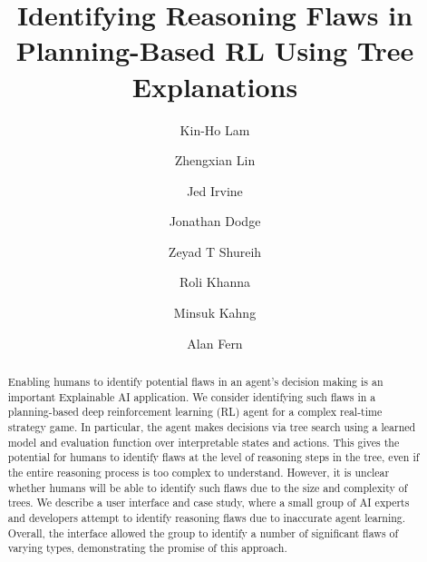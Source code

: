 \documentclass{article}
\title{Identifying Reasoning Flaws in Planning-Based RL Using Tree Explanations}
\author{
Kin-Ho Lam\and%
Zhengxian Lin\and%
Jed Irvine\and%
Jonathan Dodge\and
Zeyad T Shureih\and%
Roli Khanna\and
Minsuk Kahng\and
Alan Fern\and 
\affiliations
}
\begin{document}
\maketitle

\begin{abstract}
Enabling humans to identify potential flaws in an agent's decision making is an important Explainable AI application. We consider identifying such flaws in a planning-based deep reinforcement learning (RL) agent for a complex real-time strategy game. In particular, the agent makes decisions via tree search using a learned model and evaluation function over interpretable states and actions. This gives the potential for humans to identify flaws at the level of reasoning steps in the tree, even if the entire reasoning process is too complex to understand. However, it is unclear whether humans will be able to identify such flaws due to the size and complexity of trees. We describe a user interface and case study, where a small group of AI experts and developers attempt to identify reasoning flaws due to inaccurate agent learning. Overall, the interface allowed the group to identify a number of significant flaws of varying types, demonstrating the promise of this approach. 


\end{abstract}
\end{document}
